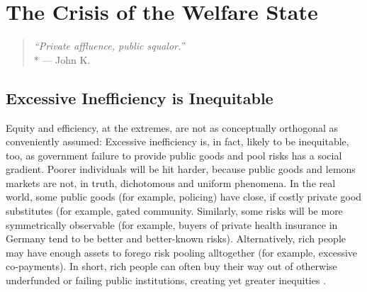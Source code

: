 



\section{The Crisis of the Welfare State}

\begin{quote}
	\emph{``Private affluence, public squalor.''}
	\\*
	--- John K.~\citealt{Galbraith1959}
\end{quote}




\subsection{Excessive Inefficiency is Inequitable} \label{sec:InefficiencyIsInequitable}
Equity and efficiency, at the extremes, are not as conceptually orthogonal as conveniently assumed:
Excessive inefficiency is, in fact, likely to be inequitable, too, as government failure to provide public goods and pool risks has a social gradient.
Poorer individuals will be hit harder, because public goods and lemons markets are not, in truth, dichotomous and uniform phenomena.
In the real world, some public goods (for example, policing) have close, if costly private good substitutes (for example, gated community.
Similarly, some risks will be more symmetrically observable (for example, buyers of private health insurance in Germany tend to be better and better-known risks).
Alternatively, rich people may have enough assets to forego risk pooling alltogether (for example, excessive co-payments).
In short, rich people can often buy their way out of otherwise underfunded or failing public institutions, creating yet greater inequities \citep{Barry2002}.

